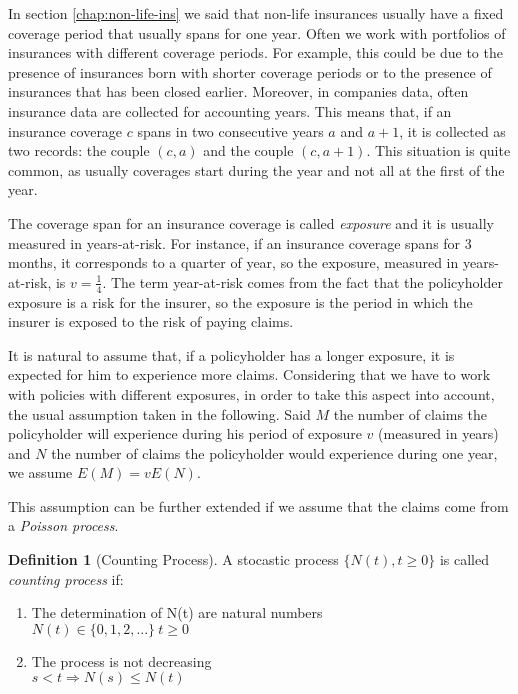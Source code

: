 \documentclass[a4paper, nobind]{templates/ociamthesis}
\theoremstyle{definition}
\newtheorem{definition}{Definition}[chapter]
\theoremstyle{definition}
\theoremstyle{definition}
\theoremstyle{remark}
\begin{document}
In section \ref{chap:non-life-ins} we said that non-life insurances usually have a fixed coverage period that usually spans for one year. Often we work with portfolios of insurances with different coverage periods. For example, this could be due to the presence of insurances born with shorter coverage periods or to the presence of insurances that has been closed earlier. Moreover, in companies data, often insurance data are collected for accounting years. This means that, if an insurance coverage \(c\) spans in two consecutive years \(a\) and \(a+1\), it is collected as two records: the couple \((c, a)\) and the couple \((c, a+1)\). This situation is quite common, as usually coverages start during the year and not all at the first of the year.

The coverage span for an insurance coverage is called \emph{exposure} and it is usually measured in years-at-risk. For instance, if an insurance coverage spans for 3 months, it corresponds to a quarter of year, so the exposure, measured in years-at-risk, is \(v=\frac{1}{4}\). The term year-at-risk comes from the fact that the policyholder exposure is a risk for the insurer, so the exposure is the period in which the insurer is exposed to the risk of paying claims.

It is natural to assume that, if a policyholder has a longer exposure, it is expected for him to experience more claims. Considering that we have to work with policies with different exposures, in order to take this aspect into account, the usual assumption taken in the following. Said \(M\) the number of claims the policyholder will experience during his period of exposure \(v\) (measured in years) and \(N\) the number of claims the policyholder would experience during one year, we assume \(E(M) = v E(N)\).

This assumption can be further extended if we assume that the claims come from a \emph{Poisson process}.

\begin{definition}[Counting Process]
\label{def:def-process-count} \iffalse (Counting Process) \fi{} A stocastic process \(\{N(t), t\ge0\}\) is called \textit{counting process} if:

\begin{enumerate}
\item The determination of N(t) are natural numbers \\
      $N(t) \in \{ 0, 1, 2, ... \} \ t\ge 0$
\item The process is not decreasing \\
      $s < t \Rightarrow N(s) \le N(t)$
\end{enumerate}
\end{definition}
\end{document}

